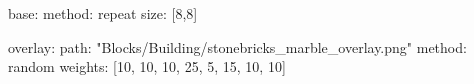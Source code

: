 base:
  method: repeat
  size: [8,8]

overlay:
  path: "Blocks/Building/stonebricks_marble_overlay.png"
  method: random
  weights: [10, 10, 10, 25, 5, 15, 10, 10]